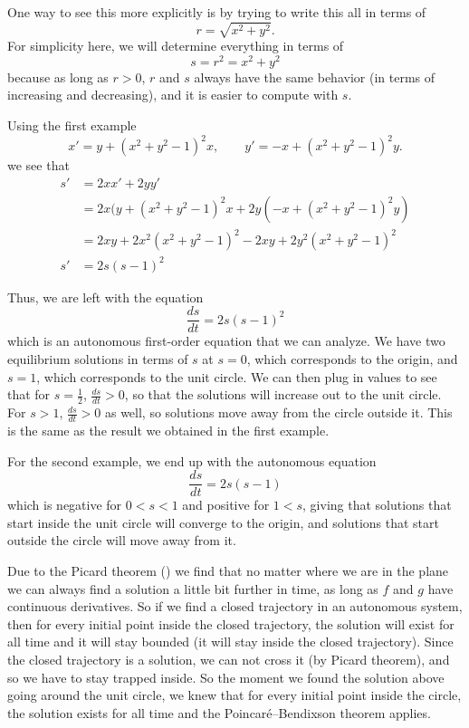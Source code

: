 One way to see this more explicitly is by trying to write this all in terms of 
\[ r = \sqrt{x^2 + y^2}. \] For simplicity here, we will determine everything in terms of \[ s = r^2 = x^2 + y^2 \] because as long as $r > 0$, $r$ and $s$ always have the same behavior (in terms of increasing and decreasing), and it is easier to compute with $s$. 

Using the first example
\begin{equation*}
x' = y + {(x^2+y^2-1)}^2 x, \qquad
y' = -x + {(x^2+y^2-1)}^2 y.
\end{equation*}
we see that
\[ \begin{split}
 s' &= 2xx' + 2yy' \\
 &= 2x(y + {(x^2+y^2-1)}^2 x + 2y(-x + {(x^2+y^2-1)}^2 y) \\
 &= 2xy + 2x^2(x^2 + y^2 - 1)^2 - 2xy + 2y^2(x^2 + y^2 - 1)^2 \\
s' &= 2s(s-1)^2
\end{split}
\]

Thus, we are left with the equation
\[ \frac{ds}{dt} = 2s(s-1)^2 \]
which is an autonomous first-order equation that we can analyze. We have two equilibrium solutions in terms of $s$ at $s=0$, which corresponds to the origin, and $s=1$, which corresponds to the unit circle. We can then plug in values to see that for $s = \frac{1}{2}$, $\frac{ds}{dt} > 0$, so that the solutions will increase out to the unit circle. For $s>1$, $\frac{ds}{dt} > 0$ as well, so solutions move away from the circle outside it. This is the same as the result we obtained in the first example.

For the second example, we end up with the autonomous equation
\[ \frac{ds}{dt} = 2s(s-1) \] which is negative for $0 < s < 1$ and positive for $1 < s$, giving that solutions that start inside the unit circle will converge to the origin, and solutions that start outside the circle will move away from it.

Due to the Picard theorem () we find that no matter
where we are in the plane we can always find a solution a little bit
further in time,
as long as $f$ and $g$ have continuous derivatives.  So 
if we find a closed trajectory in an autonomous system,
then for every initial point inside
the closed trajectory, the solution will exist for all time and it will stay
bounded (it will stay inside the closed trajectory). Since the closed trajectory is a solution, we can not cross it (by Picard theorem), and so we have to stay trapped inside. So the moment
we found the solution above going around the unit circle, we knew that for
every initial point inside the circle, the solution exists for all time and
the Poincar\'e--Bendixson theorem applies.

